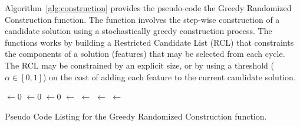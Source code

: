 Algorithm~\ref{alg:construction} provides the pseudo-code the Greedy Randomized Construction function. The function involves the step-wise construction of a candidate solution using a stochastically greedy construction process. The functions works by building a Restricted Candidate List (RCL) that constraints the components of a solution (features) that may be selected from each cycle. The RCL may be constrained by an explicit size, or by using a threshold ($\alpha \in [0,1]$) on the cost of adding each feature to the current candidate solution.

\begin{algorithm}[ht]
	\SetLine

	\KwIn{\Alpha}
	\KwOut{\Candidate}
	\Candidate $\leftarrow 0$\;
	\While{\Candidate $\neq$ \ProblemSize} {
		\FeatureCosts $\leftarrow 0$\;
		\For{\ProblemFeature $\notin$ \Candidate}{
			\FeatureCosts $\leftarrow$ \CostImpactOfFeature{\Candidate, \ProblemFeature}\;
		}
		\RCL $\leftarrow 0$\;
		\ProblemFeatureMinCost $\leftarrow$ \MinCost{\FeatureCosts}\;
		\ProblemFeatureMaxCost $\leftarrow$ \MaxCost{\FeatureCosts}\;
		\For{\ProblemFeatureCost $\in$ \FeatureCosts} {
			\If{\ProblemFeatureCost $\leq$ $\ProblemFeatureMinCost + \alpha \cdot (\ProblemFeatureMaxCost - \ProblemFeatureMinCost)$ } {
				\RCL $\leftarrow$ \ProblemFeature\;
			}
		}
		\Candidate $\leftarrow$ \SelectRandomFeature{\RCL}\;
	}
	\Return{\Candidate}\;
	\caption{Pseudo Code Listing for the Greedy Randomized Construction function.}
	\label{alg:construction}
\end{algorithm}

